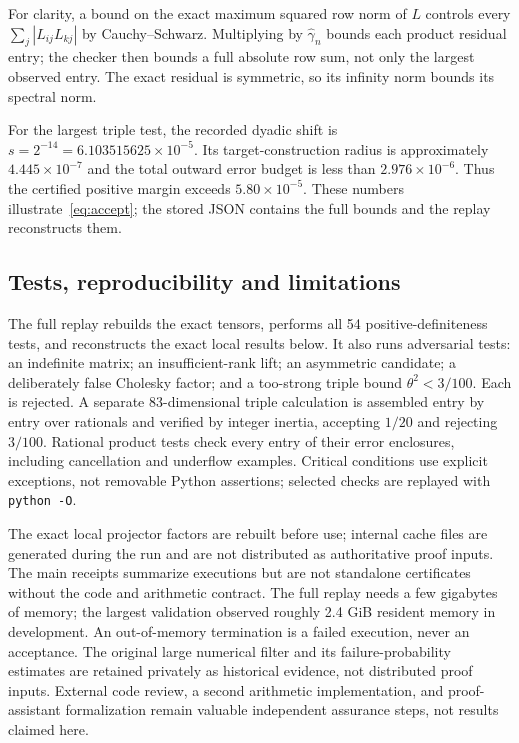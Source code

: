 \documentclass[11pt,a4paper]{article}
\theoremstyle{remark}\newtheorem{remark}[theorem]{Remark}
\begin{document}
For clarity, a bound on the exact maximum squared row norm of $L$ controls every $\sum_j|L_{ij}L_{kj}|$ by Cauchy--Schwarz. Multiplying by $\widehat\gamma_n$ bounds each product residual entry; the checker then bounds a full absolute row sum, not only the largest observed entry. The exact residual is symmetric, so its infinity norm bounds its spectral norm.

For the largest triple test, the recorded dyadic shift is $s=2^{-14}=6.103515625\times10^{-5}$. Its target-construction radius is approximately $4.445\times10^{-7}$ and the total outward error budget is less than $2.976\times10^{-6}$. Thus the certified positive margin exceeds $5.80\times10^{-5}$. These numbers illustrate~\eqref{eq:accept}; the stored JSON contains the full bounds and the replay reconstructs them.

\subsection{Tests, reproducibility and limitations}
The full replay rebuilds the exact tensors, performs all 54 positive-definiteness tests, and reconstructs the exact local results below. It also runs adversarial tests: an indefinite matrix; an insufficient-rank lift; an asymmetric candidate; a deliberately false Cholesky factor; and a too-strong triple bound $\theta^2<3/100$. Each is rejected. A separate 83-dimensional triple calculation is assembled entry by entry over rationals and verified by integer inertia, accepting $1/20$ and rejecting $3/100$. Rational product tests check every entry of their error enclosures, including cancellation and underflow examples. Critical conditions use explicit exceptions, not removable Python assertions; selected checks are replayed with \texttt{python -O}.

The exact local projector factors are rebuilt before use; internal cache files are generated during the run and are not distributed as authoritative proof inputs. The main receipts summarize executions but are not standalone certificates without the code and arithmetic contract. The full replay needs a few gigabytes of memory; the largest validation observed roughly 2.4 GiB resident memory in development. An out-of-memory termination is a failed execution, never an acceptance. The original large numerical filter and its failure-probability estimates are retained privately as historical evidence, not distributed proof inputs. External code review, a second arithmetic implementation, and proof-assistant formalization remain valuable independent assurance steps, not results claimed here.
\end{document}
